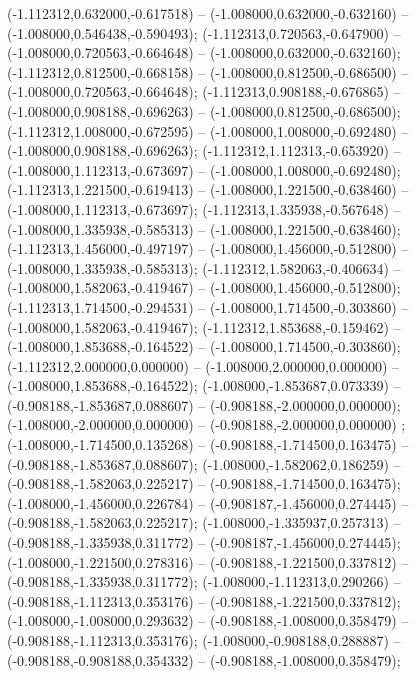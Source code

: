 (-1.112312,0.632000,-0.617518) -- (-1.008000,0.632000,-0.632160) -- (-1.008000,0.546438,-0.590493);
 (-1.112313,0.720563,-0.647900) -- (-1.008000,0.720563,-0.664648) -- (-1.008000,0.632000,-0.632160);
 (-1.112312,0.812500,-0.668158) -- (-1.008000,0.812500,-0.686500) -- (-1.008000,0.720563,-0.664648);
 (-1.112313,0.908188,-0.676865) -- (-1.008000,0.908188,-0.696263) -- (-1.008000,0.812500,-0.686500);
 (-1.112312,1.008000,-0.672595) -- (-1.008000,1.008000,-0.692480) -- (-1.008000,0.908188,-0.696263);
 (-1.112312,1.112313,-0.653920) -- (-1.008000,1.112313,-0.673697) -- (-1.008000,1.008000,-0.692480);
 (-1.112313,1.221500,-0.619413) -- (-1.008000,1.221500,-0.638460) -- (-1.008000,1.112313,-0.673697);
 (-1.112313,1.335938,-0.567648) -- (-1.008000,1.335938,-0.585313) -- (-1.008000,1.221500,-0.638460);
 (-1.112313,1.456000,-0.497197) -- (-1.008000,1.456000,-0.512800) -- (-1.008000,1.335938,-0.585313);
 (-1.112312,1.582063,-0.406634) -- (-1.008000,1.582063,-0.419467) -- (-1.008000,1.456000,-0.512800);
 (-1.112313,1.714500,-0.294531) -- (-1.008000,1.714500,-0.303860) -- (-1.008000,1.582063,-0.419467);
 (-1.112312,1.853688,-0.159462) -- (-1.008000,1.853688,-0.164522) -- (-1.008000,1.714500,-0.303860);
 (-1.112312,2.000000,0.000000) -- (-1.008000,2.000000,0.000000) -- (-1.008000,1.853688,-0.164522);
 (-1.008000,-1.853687,0.073339) -- (-0.908188,-1.853687,0.088607) -- (-0.908188,-2.000000,0.000000);
 (-1.008000,-2.000000,0.000000) -- (-0.908188,-2.000000,0.000000) ;
 (-1.008000,-1.714500,0.135268) -- (-0.908188,-1.714500,0.163475) -- (-0.908188,-1.853687,0.088607);
 (-1.008000,-1.582062,0.186259) -- (-0.908188,-1.582063,0.225217) -- (-0.908188,-1.714500,0.163475);
 (-1.008000,-1.456000,0.226784) -- (-0.908187,-1.456000,0.274445) -- (-0.908188,-1.582063,0.225217);
 (-1.008000,-1.335937,0.257313) -- (-0.908188,-1.335938,0.311772) -- (-0.908187,-1.456000,0.274445);
 (-1.008000,-1.221500,0.278316) -- (-0.908188,-1.221500,0.337812) -- (-0.908188,-1.335938,0.311772);
 (-1.008000,-1.112313,0.290266) -- (-0.908188,-1.112313,0.353176) -- (-0.908188,-1.221500,0.337812);
 (-1.008000,-1.008000,0.293632) -- (-0.908188,-1.008000,0.358479) -- (-0.908188,-1.112313,0.353176);
 (-1.008000,-0.908188,0.288887) -- (-0.908188,-0.908188,0.354332) -- (-0.908188,-1.008000,0.358479);
